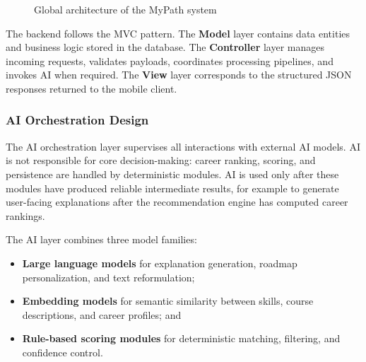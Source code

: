 \documentclass[12pt,a4paper]{article}
\begin{document}
\begin{figure}[H]
  \centering
  \caption{Global architecture of the MyPath system}
\end{figure}

The backend follows the MVC pattern. The \textbf{Model} layer contains data entities and business logic stored in the database. The \textbf{Controller} layer manages incoming requests, validates payloads, coordinates processing pipelines, and invokes AI when required. The \textbf{View} layer corresponds to the structured JSON responses returned to the mobile client.

\subsubsection{AI Orchestration Design}

The AI orchestration layer supervises all interactions with external AI models. AI is not responsible for core decision-making: career ranking, scoring, and persistence are handled by deterministic modules. AI is used only after these modules have produced reliable intermediate results, for example to generate user-facing explanations after the recommendation engine has computed career rankings.

The AI layer combines three model families:
\begin{itemize}
  \item \textbf{Large language models} for explanation generation, roadmap personalization, and text reformulation;
  \item \textbf{Embedding models} for semantic similarity between skills, course descriptions, and career profiles; and
  \item \textbf{Rule-based scoring modules} for deterministic matching, filtering, and confidence control.
\end{itemize}
\end{document}
